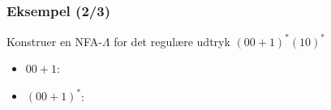 \begin{frame}
\frametitle{Eksempel (2/3)}
Konstruer en NFA-$\Lambda$ for det regulære udtryk $(00+1)^*(10)^*$
\begin{itemize}[<+->]
\item $00+1$:
\begin{center}
\end{center}
\item $(00+1)^*$:
\begin{center}
\end{center}
\end{itemize}
\end{frame}


